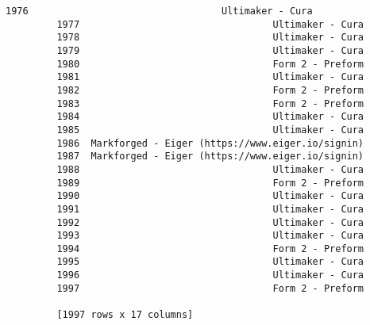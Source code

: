 \documentclass[11pt]{article}
\begin{document}
\begin{Verbatim}[commandchars=\\\{\}]
         1976                                  Ultimaker - Cura  
         1977                                  Ultimaker - Cura  
         1978                                  Ultimaker - Cura  
         1979                                  Ultimaker - Cura  
         1980                                  Form 2 - Preform  
         1981                                  Ultimaker - Cura  
         1982                                  Form 2 - Preform  
         1983                                  Form 2 - Preform  
         1984                                  Ultimaker - Cura  
         1985                                  Ultimaker - Cura  
         1986  Markforged - Eiger (https://www.eiger.io/signin)  
         1987  Markforged - Eiger (https://www.eiger.io/signin)  
         1988                                  Ultimaker - Cura  
         1989                                  Form 2 - Preform  
         1990                                  Ultimaker - Cura  
         1991                                  Ultimaker - Cura  
         1992                                  Ultimaker - Cura  
         1993                                  Ultimaker - Cura  
         1994                                  Form 2 - Preform  
         1995                                  Ultimaker - Cura  
         1996                                  Ultimaker - Cura  
         1997                                  Form 2 - Preform  
         
         [1997 rows x 17 columns]
\end{Verbatim}
            
\end{document}
